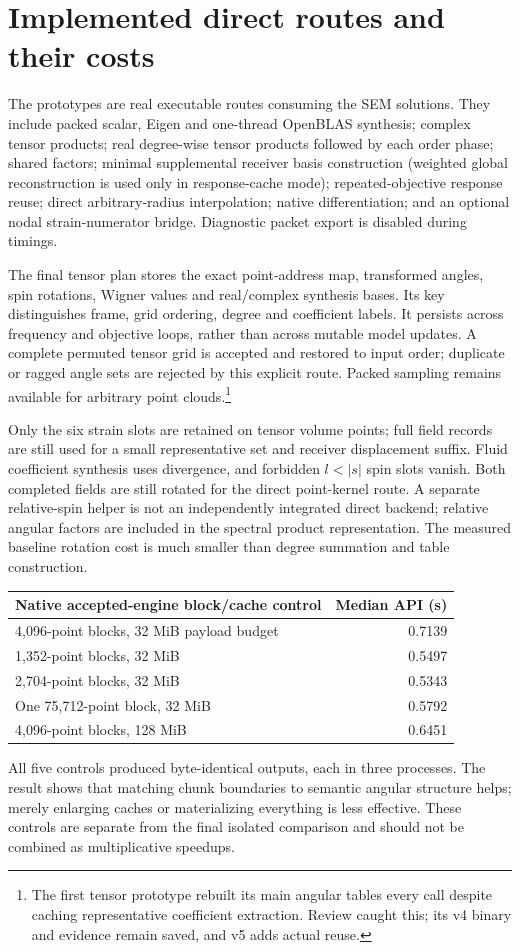 \section{Implemented direct routes and their costs}
The prototypes are real executable routes consuming the SEM solutions. They include packed scalar, Eigen and one-thread OpenBLAS synthesis; complex tensor products; real degree-wise tensor products followed by each order phase; shared factors; minimal supplemental receiver basis construction (weighted global reconstruction is used only in response-cache mode); repeated-objective response reuse; direct arbitrary-radius interpolation; native differentiation; and an optional nodal strain-numerator bridge. Diagnostic packet export is disabled during timings.

The final tensor plan stores the exact point-address map, transformed angles, spin rotations, Wigner values and real/complex synthesis bases. Its key distinguishes frame, grid ordering, degree and coefficient labels. It persists across frequency and objective loops, rather than across mutable model updates. A complete permuted tensor grid is accepted and restored to input order; duplicate or ragged angle sets are rejected by this explicit route. Packed sampling remains available for arbitrary point clouds.\footnote{The first tensor prototype rebuilt its main angular tables every call despite caching representative coefficient extraction. Review caught this; its v4 binary and evidence remain saved, and v5 adds actual reuse.}

Only the six strain slots are retained on tensor volume points; full field records are still used for a small representative set and receiver displacement suffix. Fluid coefficient synthesis uses divergence, and forbidden $l<|s|$ spin slots vanish. Both completed fields are still rotated for the direct point-kernel route. A separate relative-spin helper is not an independently integrated direct backend; relative angular factors are included in the spectral product representation. The measured baseline rotation cost is much smaller than degree summation and table construction.

\begin{center}
\begin{tabular}{p{}r}
\toprule
Native accepted-engine block/cache control & Median API (s)\\
\midrule
4,096-point blocks, 32 MiB payload budget & 0.7139\\
1,352-point blocks, 32 MiB & 0.5497\\
2,704-point blocks, 32 MiB & 0.5343\\
One 75,712-point block, 32 MiB & 0.5792\\
4,096-point blocks, 128 MiB & 0.6451\\
\bottomrule
\end{tabular}
\end{center}
All five controls produced byte-identical outputs, each in three processes. The result shows that matching chunk boundaries to semantic angular structure helps; merely enlarging caches or materializing everything is less effective. These controls are separate from the final isolated comparison and should not be combined as multiplicative speedups.


